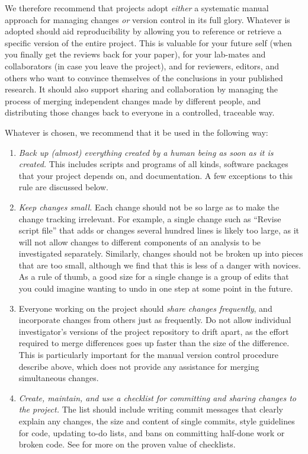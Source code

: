 \documentclass[10pt]{article}
\newcommand{\recommend}[1]{\textit{#1}}
\begin{document}
We therefore recommend that projects adopt \emph{either} a systematic
manual approach for managing changes \emph{or} version control in its
full glory.  Whatever is adopted should aid reproducibility by
allowing you to reference or retrieve a specific version of the entire
project. This is valuable for your future self (when you finally get
the reviews back for your paper), for your lab-mates and collaborators
(in case you leave the project), and for reviewers, editors, and
others who want to convince themselves of the conclusions in your
published research.  It should also support sharing and collaboration
by managing the process of merging independent changes made by
different people, and distributing those changes back to everyone in a
controlled, traceable way.

Whatever is chosen, we recommend that it be used in the following way:

\begin{enumerate}

\item
  \recommend{Back up (almost) everything created by a human being as
    soon as it is created.} This includes scripts and programs of all
  kinds, software packages that your project depends on, and
  documentation. A few exceptions to this rule are discussed below.

\item
  \recommend{Keep changes small.}  Each change should not be so large
  as to make the change tracking irrelevant. For example, a single
  change such as ``Revise script file'' that adds or changes several
  hundred lines is likely too large, as it will not allow changes to
  different components of an analysis to be investigated
  separately. Similarly, changes should not be broken up into pieces
  that are too small, although we find that this is less of a danger
  with novices. As a rule of thumb, a good size for a single change is
  a group of edits that you could imagine wanting to undo in one step
  at some point in the future.

\item
  Everyone working on the project should \recommend{share changes
    frequently}, and incorporate changes from others just as
  frequently. Do not allow individual investigator's versions of the
  project repository to drift apart, as the effort required to merge
  differences goes up faster than the size of the difference. This is
  particularly important for the manual version control procedure
  describe above, which does not provide any assistance for merging
  simultaneous changes.

\item
  \recommend{Create, maintain, and use a checklist for committing and
    sharing changes to the project.}  The list should include
  writing commit messages that clearly explain any changes,
  the size and content of single commits,
  style guidelines for code,
  updating to-do lists,
  and bans on committing half-done work or broken code.
  See \cite{gawande2011} for more on the proven value of checklists.

\end{enumerate}
\end{document}
